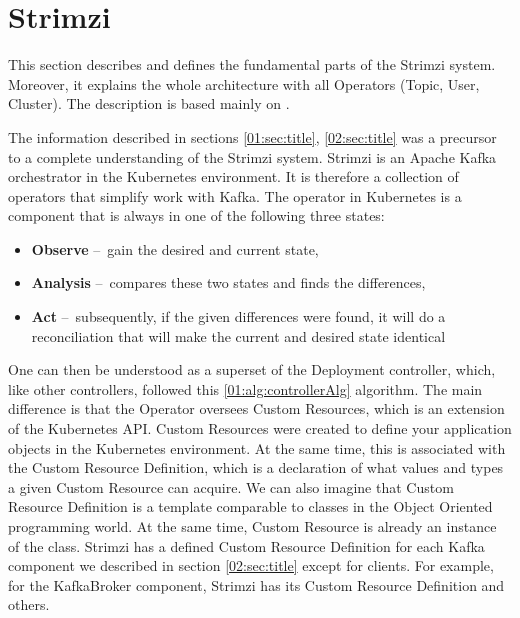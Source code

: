 \section{Strimzi}
\label{03:title}

This section describes and defines the fundamental parts of the Strimzi system. Moreover, it explains the whole architecture with all Operators (Topic, User, Cluster). The description is based mainly on \cite{strimziDoc, strimziBlogPosts}.

The information described in sections \ref{01:sec:title}, \ref{02:sec:title} was a precursor to a complete understanding of the Strimzi system. Strimzi is an Apache Kafka orchestrator in the Kubernetes environment. It is therefore a collection of operators that simplify work with Kafka. The operator in Kubernetes is a component that is always in one of the following three states:
\begin{itemize}[itemsep=1mm, parsep=0pt]
    \item \textbf{Observe} \---\ gain the desired and current state,
    \item \textbf{Analysis} \---\ compares these two states and finds the differences,
    \item \textbf{Act} \---\ subsequently, if the given differences were found, it will do a reconciliation that will make the current and desired state identical
\end{itemize}

One can then be understood as a superset of the Deployment controller, which, like other controllers, followed this \ref{01:alg:controllerAlg} algorithm. The main difference is that the Operator oversees Custom Resources, which is an extension of the Kubernetes API. Custom Resources were created to define your application objects in the Kubernetes environment. At the same time, this is associated with the Custom Resource Definition, which is a declaration of what values and types a given Custom Resource can acquire. We can also imagine that Custom Resource Definition is a template comparable to classes in the Object Oriented programming world. At the same time, Custom Resource is already an instance of the class. Strimzi has a defined Custom Resource Definition for each Kafka component we described in section \ref{02:sec:title} except for clients. For example, for the KafkaBroker component, Strimzi has its Custom Resource Definition and others. 

